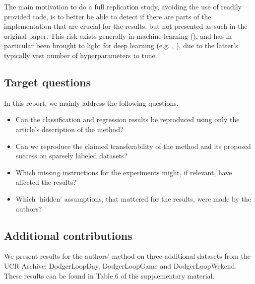 \documentclass{article}
\begin{document}
The main motivation to do a full replication study, avoiding the use of readily provided code, is to better be able to detect if there are parts of the implementation that are crucial for the results, but not presented as such in the original paper. This risk exists generally in machine learning (\cite{LiptonTroubling}), and has in particular been brought to light for deep learning (e.g. \cite{henderson2017reinforcement}, \cite{Hyper1Melis}), due to the latter's typically vast number of hyperparameters to tune.


\subsection{Target questions}

In this report, we mainly address the following questions.

\begin{itemize}
    \item Can the classification and regression results be reproduced using only the article's description of the method?
    \item Can we reproduce the claimed transferability of the method and its proposed success on sparsely labeled datasets?
    \item Which missing instructions for the experiments might, if relevant, have affected the results?
    \item Which 'hidden' assumptions, that mattered for the results, were made by the authors?
    
\end{itemize}

\subsection{Additional contributions}
We present results for the authors' method on three additional datasets from the UCR Archive: DodgerLoopDay, DodgerLoopGame and DodgerLoopWekend. These results can be found in Table 6 of the supplementary material.
\end{document}
